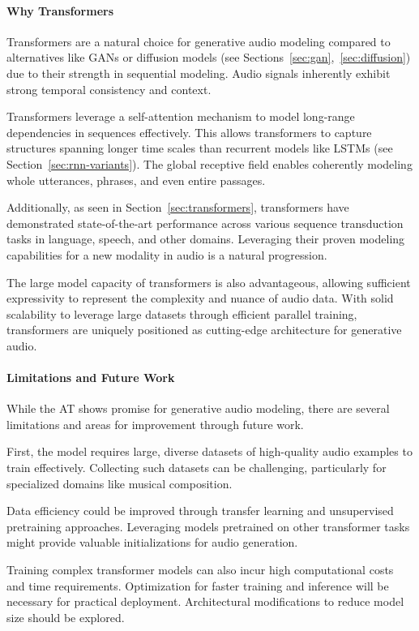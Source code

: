 \paragraph{Why Transformers}
Transformers are a natural choice for generative audio modeling compared to alternatives like \acp{GAN} or diffusion models (see Sections~\ref{sec:gan},~\ref{sec:diffusion}) due to their strength in sequential modeling. Audio signals inherently exhibit strong temporal consistency and context.

Transformers leverage a self-attention mechanism to model long-range dependencies in sequences effectively. This allows transformers to capture structures spanning longer time scales than recurrent models like \acp{LSTM} (see Section~\ref{sec:rnn-variants}). The global receptive field enables coherently modeling whole utterances, phrases, and even entire passages.

Additionally, as seen in Section~\ref{sec:transformers}, transformers have demonstrated state-of-the-art performance across various sequence transduction tasks in language, speech, and other domains. Leveraging their proven modeling capabilities for a new modality in audio is a natural progression.

The large model capacity of transformers is also advantageous, allowing sufficient expressivity to represent the complexity and nuance of audio data. With solid scalability to leverage large datasets through efficient parallel training, transformers are uniquely positioned as cutting-edge architecture for generative audio.

\paragraph{Limitations and Future Work}
While the \ac{AT} shows promise for generative audio modeling, there are several limitations and areas for improvement through future work.

First, the model requires large, diverse datasets of high-quality audio examples to train effectively. Collecting such datasets can be challenging, particularly for specialized domains like musical composition.

Data efficiency could be improved through transfer learning and unsupervised pretraining approaches. Leveraging models pretrained on other transformer tasks might provide valuable initializations for audio generation.

Training complex transformer models can also incur high computational costs and time requirements. Optimization for faster training and inference will be necessary for practical deployment. Architectural modifications to reduce model size should be explored.


